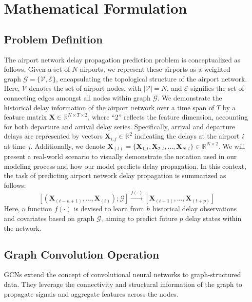 \documentclass[conference]{IEEEtran}
\begin{document}
\section{Mathematical Formulation}

\subsection{Problem Definition}

The airport network delay propagation prediction problem is conceptualized as follows. Given a set of \( N \) airports, we represent these airports as a weighted graph \( \mathcal{G} = \{\mathcal{V}, \mathcal{E}\} \), encapsulating the topological structure of the airport network. Here, \( \mathcal{V} \) denotes the set of airport nodes, with \( |\mathcal{V}| = N \), and \( \mathcal{E} \) signifies the set of connecting edges amongst all nodes within graph \( \mathcal{G} \). We demonstrate the historical delay information of the airport network over a time span of \( T \) by a feature matrix \( \mathbf{X} \in \mathbb{R}^{N \times T \times 2} \), where ``2'' reflects the feature dimension, accounting for both departure and arrival delay series. Specifically, arrival and departure delays are represented by vectors \( \mathbf{X}_{i,j} \in \mathbb{R}^{2} \) indicating the delays at the airport \( i \) at time \( j \). Additionally, we denote \( \mathbf{X}_{(t)} = \{\mathbf{X}_{1,t}, \mathbf{X}_{2,t}, \ldots, \mathbf{X}_{N,t}\} \in \mathbb{R}^{N \times 2} \). We will present a real-world scenario to visually demonstrate the notation used in our modeling process and how our model predicts delay propagation. In this context, the task of predicting airport network delay propagation is summarized as follows:
\begin{equation}
    \left[\left(\mathbf{X}_{(t-h+1)}, \ldots, \mathbf{X}_{(t)}\right); \mathcal{G}\right] \xrightarrow{f(\cdot)} \left[\mathbf{X}_{(t+1)}, \ldots, \mathbf{X}_{(t+p)}\right]
\end{equation}
Here, a function \( f(\cdot) \) is devised to learn from \( h \) historical delay observations and covariates based on graph \( \mathcal{G} \), aiming to predict future \( p \) delay states within the network.

\subsection{Graph Convolution Operation}
GCNs extend the concept of convolutional neural networks to graph-structured data. They leverage the connectivity and structural information of the graph to propagate signals and aggregate features across the nodes.
\end{document}
